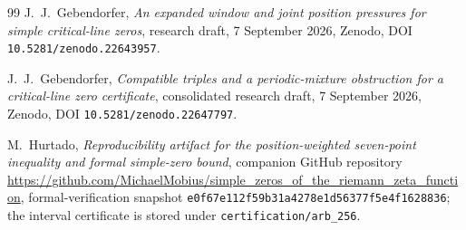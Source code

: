 \documentclass[11pt]{article}
\begin{document}
\begin{thebibliography}{99}
J.~J.~Gebendorfer,
\emph{An expanded window and joint position pressures for simple
critical-line zeros},
research draft, 7 September 2026,
Zenodo, DOI \texttt{10.5281/zenodo.22643957}.

J.~J.~Gebendorfer,
\emph{Compatible triples and a periodic-mixture obstruction for a
critical-line zero certificate},
consolidated research draft, 7 September 2026,
Zenodo, DOI \texttt{10.5281/zenodo.22647797}.

M.~Hurtado,
\emph{Reproducibility artifact for the position-weighted seven-point
inequality and formal simple-zero bound},
companion GitHub repository
\url{https://github.com/MichaelMobius/simple_zeros_of_the_riemann_zeta_function},
formal-verification snapshot
\texttt{e0f67e112f59b31a4278e1d56377f5e4f1628836};
the interval certificate is stored under \texttt{certification/arb\_256}.

\end{thebibliography}
\end{document}
